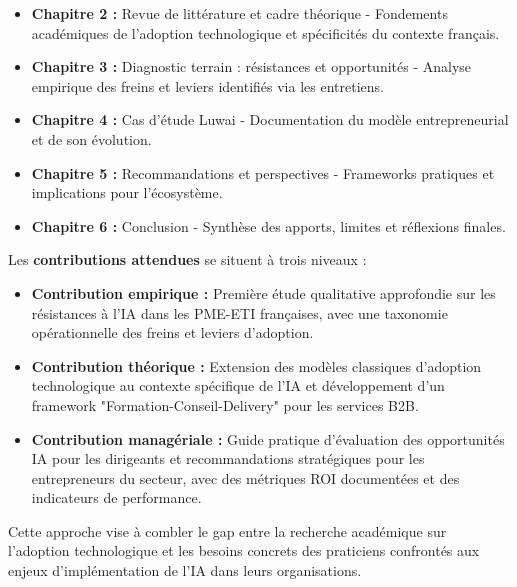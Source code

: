\begin{itemize}
    \item \textbf{Chapitre 2 :} Revue de littérature et cadre théorique - Fondements académiques de l'adoption technologique et spécificités du contexte français.
    \item \textbf{Chapitre 3 :} Diagnostic terrain : résistances et opportunités - Analyse empirique des freins et leviers identifiés via les entretiens.
    \item \textbf{Chapitre 4 :} Cas d'étude Luwai - Documentation du modèle entrepreneurial et de son évolution.
    \item \textbf{Chapitre 5 :} Recommandations et perspectives - Frameworks pratiques et implications pour l'écosystème.
    \item \textbf{Chapitre 6 :} Conclusion - Synthèse des apports, limites et réflexions finales.
\end{itemize}

Les \textbf{contributions attendues} se situent à trois niveaux :

\begin{itemize}
    \item \textbf{Contribution empirique :} Première étude qualitative approfondie sur les résistances à l'IA dans les PME-ETI françaises, avec une taxonomie opérationnelle des freins et leviers d'adoption.
    \item \textbf{Contribution théorique :} Extension des modèles classiques d'adoption technologique au contexte spécifique de l'IA et développement d'un framework "Formation-Conseil-Delivery" pour les services B2B.
    \item \textbf{Contribution managériale :} Guide pratique d'évaluation des opportunités IA pour les dirigeants et recommandations stratégiques pour les entrepreneurs du secteur, avec des métriques ROI documentées et des indicateurs de performance.
\end{itemize}

Cette approche vise à combler le gap entre la recherche académique sur l'adoption technologique et les besoins concrets des praticiens confrontés aux enjeux d'implémentation de l'IA dans leurs organisations.
